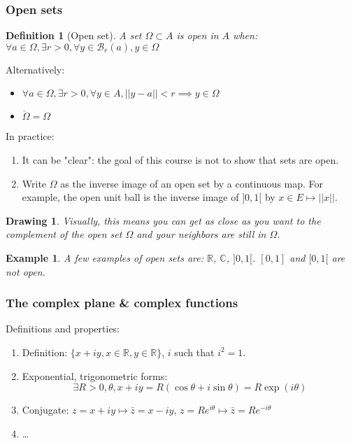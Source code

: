 \documentclass{article}
\newtheorem*{defi}{Definition}
\newtheorem*{example}{Example}
\newtheorem*{schema}{Drawing}
\begin{document}
\subsubsection{Open sets}
\begin{defi}[Open set]
    A set $\Omega \subset A$ is open in $A$ when:$ \forall a\in\Omega, \exists r > 0, \forall y \in \mathcal{B}_r(a), y \in \Omega $
\end{defi}

Alternatively:
    \begin{itemize}
        \item $ \forall a\in\Omega, \exists r > 0, \forall y \in A, ||y - a|| < r \implies y \in \Omega $
        \item $\mathring \Omega = \Omega$
    \end{itemize}
In practice:
\begin{enumerate}
    \item It can be "clear": the goal of this course is not to show that sets are open. 
    \item Write $\Omega$ as the inverse image of an open set by a continuous map. For example, the open unit ball is the inverse image of $]0,1[$ by $x\in E \mapsto ||x||$.
\end{enumerate}
\begin{schema} Visually, this means you can get as close as you want to the complement of the open set $\Omega$ and your neighbors are still in $\Omega$.
\end{schema}

\begin{example}
A few examples of open sets are: $\mathbb{R}$, $\mathbb{C}$, $]0,1[$. $[0,1]$ and $[0,1[$ are not open.
\end{example}

\subsubsection{The complex plane \& complex functions}
Definitions and properties:
\begin{enumerate}
    \item Definition: $\lbrace x+iy, x\in\mathbb{R}, y\in\mathbb{R} \rbrace$, $i$ such that $i^2=1$.
    \item Exponential, trigonometric forms: $$\exists R>0, \theta, x+iy = R(\cos\theta + i\sin\theta)=R\exp(i\theta) $$
    \item Conjugate: $z=x+iy \mapsto \bar z = x - iy$, $z = Re^{i\theta} \mapsto \bar z = Re^{-i\theta}$
    \item \dots 
\end{enumerate}
\end{document}
